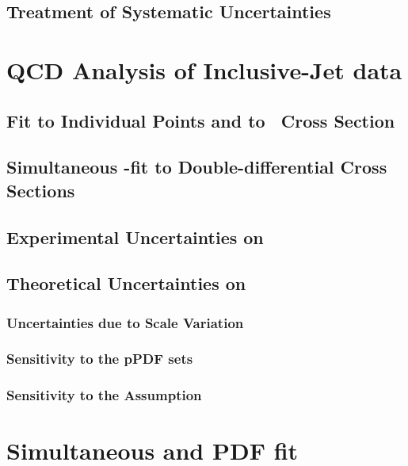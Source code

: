 \subsection{Treatment of Systematic Uncertainties}
\label{subsec:sysunctreatment}


\section{QCD Analysis of Inclusive-Jet data}
\label{sec:asfit}


\subsection{Fit to Individual Points and to \dsdetjetb~Cross Section}
\label{subsec:singledifasfit}


\subsection{Simultaneous \asz-fit to Double-differential Cross Sections}
\label{subsec:doubledifasfit}
% 

\subsection{Experimental Uncertainties on \asz}
\label{subsec:asexpunc}

\subsection{Theoretical Uncertainties on \asz}
\label{subsec:asthunc}
% 

\subsubsection{Uncertainties due to Scale Variation}
\label{subsec:asscalevar}

\subsubsection{Sensitivity to the pPDF sets}
\label{subsec:aspdfassump}

\subsubsection{Sensitivity to the \asz Assumption}
\label{subsec:asassump}

\section{Simultaneous \asz and PDF fit}
\label{sec:aspdffit}